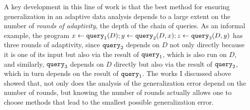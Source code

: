 A key development in this line of work is that the best method for ensuring generalization in an adaptive data analysis depends to a large extent on the number of \emph{rounds of adaptivity}, the depth of the chain of queries. 
As an informal example, the program $x \leftarrow {\tt query}_1(D);y \leftarrow {\tt query}_2(D,x);z \leftarrow {\tt query}_3(D,y)$ has three rounds of adaptivity, since ${\tt query}_2$  depends on $D$ not only directly because it is one of its input but also via the result of ${\tt query}_1$, 
which is also run on $D$, and similarly,  ${\tt query}_3$ depends on $D$ directly but also via the result of ${\tt query}_2$, which in turn depends on the result of ${\tt query}_1$. 
The works I discussed above showed that, not only does the analysis of the generalization error depend on the number of rounds, 
but knowing the number of rounds actually allows one to choose methods that lead to the smallest possible generalization error. 


